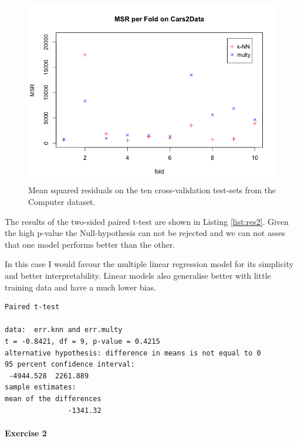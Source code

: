 \documentclass{paper}
\begin{document}
\begin{figure}[h]
\begin{center}
\includegraphics[width=0.8\linewidth]{vsComp}
\end{center}
\caption{Mean squared residuals on the ten cross-validation test-sets from the Computer dataset.  }
\label{fig:vsComp}
\end{figure}

The results of the two-sided paired t-test are shown in Listing \ref{list:res2}. Given the high p-value the Null-hypothesis can not be rejected 
and we can not asses that one model performs better than the other. 

In this case I would favour the multiple linear regression model for its simplicity and better interpretability. Linear models also generalise better
 with little training data and have a much lower bias. 

\begin{minipage}{\linewidth}
  \begin{lstlisting}[caption={Results of paired t-test 1-NN vs. multiple regression.},
    label=list:res2]
Paired t-test

data:  err.knn and err.multy
t = -0.8421, df = 9, p-value = 0.4215
alternative hypothesis: difference in means is not equal to 0
95 percent confidence interval:
 -4944.528  2261.889
sample estimates:
mean of the differences 
               -1341.32 
  \end{lstlisting}
\end{minipage}



\paragraph{Exercise 2}
\end{document}
